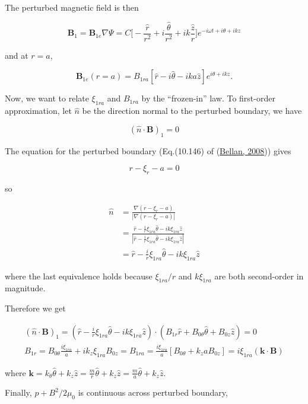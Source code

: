 \documentclass[
  notoc %
]{tufte-book}
\begin{document}
The perturbed magnetic field is then

\[
\mathbf{B}_1=\mathbf{B}_{1e}\nabla\Psi = C\big[ -\frac{\hat{r}}{r^2}+i\frac{\hat{\theta}}{r^2}+ik\frac{\hat{z}}{r} \big]e^{-i\omega t+i\theta+ikz}
\]

and at \(r=a\),

\[
\mathbf{B}_{1e}(r=a)=B_{1ra}[\hat{r}-i\hat{\theta}-ika\hat{z}]e^{i\theta+ikz}.
\]

Now, we want to relate \(\xi_{1ra}\) and \(B_{1ra}\) by the
``frozen-in'' law. To first-order approximation, let \(\hat{n}\) be the
direction normal to the perturbed boundary, we have

\[
(\hat{n}\cdot\mathbf{B})_1=0
\]

The equation for the perturbed boundary (Eq.(10.146) of
(\protect\hyperlink{ref-bellan2008fundamentals}{Bellan, 2008})) gives

\[
r-\xi_r-a =0
\]

so

\[
\begin{aligned}
\hat{n}&=\frac{\nabla(r-\xi_r-a)}{|\nabla(r-\xi_r-a)|} \\
&=\frac{\hat{r}-\frac{i}{r}\xi_{1ra}\hat{\theta}-ik\xi_{1ra}\hat{z}}{|\hat{r}-\frac{i}{r}\xi_{1ra}\hat{\theta}-ik\xi_{1ra}\hat{z}|} \\
&=\hat{r}-\frac{i}{r}\xi_{1ra}\hat{\theta}-ik\xi_{1ra}\hat{z}
\end{aligned}
\]

where the last equivalence holds because \(\xi_{1ra}/r\) and
\(k\xi_{1ra}\) are both second-order in magnitude.

Therefore we get

\[
\begin{aligned}
(\hat{n}\cdot\mathbf{B})_1 = ( \hat{r}-\frac{i}{r}\xi_{1ra}\hat{\theta}-ik\xi_{1ra}\hat{z} )\cdot (B_{1r}\hat{r}+B_{0\theta}\hat{\theta}+B_{0z}\hat{z})=0 \\
B_{1r} = B_{0\theta}\frac{i\xi_{1ra}}{a}+ik_z\xi_{1ra}B_{0z}=  B_{1ra} = \frac{i\xi_{1ra}}{a}[B_{0\theta}+k_z a B_{0z}] = i\xi_{1ra}(\mathbf{k}\cdot\mathbf{B})
\end{aligned}
\]

where
\(\mathbf{k}=k_\theta \hat{\theta}+k_z\hat{z}=\frac{m}{r}\hat{\theta}+k_z\hat{z}=\frac{m}{a}\hat{\theta}+k_z\hat{z}\).

Finally, \(p+B^2/2\mu_0\) is continuous across perturbed boundary,
\end{document}
